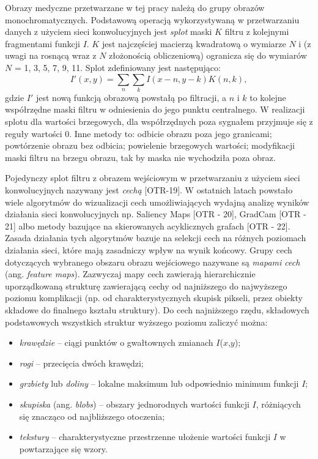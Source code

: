 Obrazy medyczne przetwarzane w tej pracy należą do grupy obrazów monochromatycznych. Podstawową operacją wykorzystywaną w przetwarzaniu danych z użyciem sieci konwolucyjnych jest \textit{splot} maski $K$ filtru z kolejnymi fragmentami funkcji $I$. $K$ jest najczęściej macierzą kwadratową o wymiarze $N$ i (z uwagi na rosnącą wraz z $N$ złożonością obliczeniową) ogranicza się do wymiarów $N$ = {1, 3, 5, 7, 9, 11}. Splot zdefiniowany jest następująco:
\begin{equation}
	I'\left(x, y\right) = \sum_{n} \sum_{k} I\left(x - n, y - k \right)K\left(n, k\right),
\end{equation}
gdzie $I'$ jest nową funkcją obrazową powstałą po filtracji, a $n$ i $k$ to kolejne współrzędne maski filtru w odniesienia do jego punktu centralnego. W realizacji splotu dla wartości brzegowych, dla współrzędnych poza sygnałem przyjmuje się z reguły wartości 0. Inne metody to: odbicie obrazu poza jego granicami; powtórzenie obrazu bez odbicia; powielenie brzegowych wartości; modyfikacji maski filtru na brzegu obrazu, tak by maska nie wychodziła poza obraz.

Pojedynczy splot filtru z obrazem wejściowym w przetwarzaniu z użyciem sieci konwolucyjnych nazywany jest \textit{cechą} [OTR-19]. W ostatnich latach powstało wiele algorytmów do wizualizacji cech umożliwiających wydajną analizę wyników działania sieci konwolucyjnych np. Saliency Maps [OTR - 20], GradCam [OTR - 21] albo metody bazujące na skierowanych acyklicznych grafach [OTR - 22]. Zasada działania tych algorytmów bazuje na selekcji cech na różnych poziomach działania sieci, które mają zasadniczy wpływ na wynik końcowy. Grupy cech dotyczących wybranego obszaru obrazu wejściowego nazywane są \textit{mapami cech} (ang. \textit{feature maps}). Zazwyczaj mapy cech zawierają hierarchicznie uporządkowaną strukturę zawierającą cechy od najniższego do najwyższego poziomu komplikacji (np. od charakterystycznych skupisk pikseli, przez obiekty składowe do finalnego kształu struktury). Do cech najniższego rzędu, składowych podstawowych wszystkich struktur wyższego poziomu zaliczyć można:
\begin{itemize}
	\item \textit{krawędzie} -- ciągi punktów o gwałtownych zmianach $I$($x$,$y$);
	\item \textit{rogi} -- przecięcia dwóch krawędzi;
	\item \textit{grzbiety} lub \textit{doliny} -- lokalne maksimum lub odpowiednio minimum funkcji $I$;
	\item \textit{skupiska} (ang. \textit{blobs}) -- obszary jednorodnych wartości funkcji $I$, różniących się znacząco od najbliższego otoczenia; 
	\item \textit{tekstury} -- charakterystyczne przestrzenne ułożenie wartości funkcji $I$ w powtarzające się wzory.
\end{itemize}

